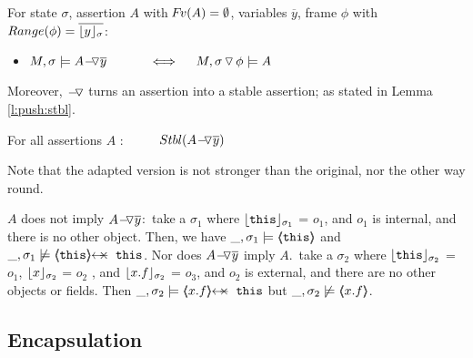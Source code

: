 \begin{lemma} 
\label{lemma:push:ass:state}
For   state  $\sigma$, assertion $A$ with $\fv(A)=\emptyset$,  variables   $\overline y$, frame $\phi$ with $Range (\phi)=\overline {\interpret \sigma y}$:


\begin{itemize} %
 \item
 \label{lemma:push:ass:state:one}
 \label{lemma:push:ass:state:two}
$M, \sigma \models \PushAS  {y} {A}\ \  \ \ \ \ \  \ \ \    \Longleftrightarrow  \ \ \ \ M,  \PushSLong {\phi} {\sigma}   \models A$
\end{itemize}  %
\end{lemma}


Moreover, $\FIXSymbolA$ turns an assertion into a stable assertion; as stated in   Lemma \ref{l:push:stbl}.

\begin{lemma}
For all    assertions $A$ : \ \ \ \ \  $\Stable{ \PushAS y A}$
\label{l:push:stbl}
% 
\end{lemma}

Note that the adapted version is not stronger than the original, nor the other way round.

\begin{example}
\label{push:does:not:imply}
\notesep   $A$ does not imply $\PushAS {y} {A}$:\  \Eg  take 
  a   $\sigma_1$ where $\interpret {\sigma_1} {\prg{this}}$ = $o_1$, and $o_1$ is internal,  and there is no other object. Then, we have
$\_,\sigma_1 \models \inside {\prg{this}}$ and $\_,\sigma_1 \not\models \protectedFrom {\prg{this}} {\prg{this}}$.
\notesep Nor does  $\PushAS {y} {A}$  imply $A$.\  \Eg  take a $\sigma_2$ where $\interpret {\sigma_2} {\prg{this}}$ = $o_1$,
 $\interpret {\sigma_2} {x}$ = $o_2$ , and  $\interpret {\sigma_2} {x.f}$ = $o_3$, and $o_2$ is external, and there are no other objects or fields.
 Then $\_,\sigma_2 \models   \protectedFrom {x.f} {\prg{this}}$ but  $\_,\sigma_2 \not\models \inside {x.f}$.
\end{example}






 
\subsection{Encapsulation} %
\label{s:preserve:encaps}
 
